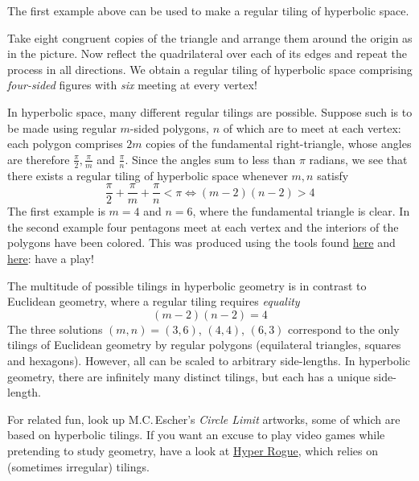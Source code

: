 \label{pg:hyptiling}

The first example above can be used to make a regular tiling of hyperbolic space.\par

\begin{minipage}[t]{0.55\linewidth}\vspace{0pt}
	Take eight congruent copies of the triangle and arrange them around the origin as in the picture. Now reflect the quadrilateral over each of its edges and repeat the process in all directions. We obtain a regular tiling of hyperbolic space comprising \emph{four-sided} figures with \emph{six} meeting at every vertex!\medbreak
	
	In hyperbolic space, many different regular tilings are possible. Suppose such is to be made using regular $m$-sided polygons, $n$ of which are to meet at each vertex: each polygon comprises $2m$ copies of the fundamental right-triangle, whose angles are therefore $\frac\pi 2, \frac\pi m$ and $\frac\pi n$.
	Since the angles sum to less than $\pi$ radians, we see that there exists a regular tiling of hyperbolic space whenever $m,n$ satisfy
	\[
		\frac\pi 2+\frac\pi m+\frac\pi n<\pi\iff (m-2)(n-2)>4
	\]
	The first example is $m=4$ and $n=6$, where the fundamental triangle is clear. In the second example four pentagons meet at each vertex and the interiors of the polygons have been colored. This was produced using the tools found
	\href{http://www.malinc.se/noneuclidean/en/poincaretiling.php}{here} and \href{http://www.malinc.se/m/ImageTiling.php}{here}: have a play!\medbreak
	
	The multitude of possible tilings in hyperbolic geometry is in contrast to Euclidean geometry, where a regular tiling requires \emph{equality}
	\[
		(m-2)(n-2)=4
	\]
	The three solutions $(m,n)=(3,6)$, $(4,4)$, $(6,3)$ correspond to the only tilings of Euclidean geometry by regular polygons (equilateral triangles, squares and hexagons). However, all can be scaled to arbitrary side-lengths. In hyperbolic geometry, there are infinitely many distinct tilings, but each has a unique side-length.\bigbreak
	
	For related fun, look up M.C.\,Escher's \emph{Circle Limit} artworks, some of which are based on hyperbolic tilings.
	If you want an excuse to play video games while pretending to study geometry, have a look at \href{http://www.roguetemple.com/z/hyper/}{Hyper Rogue}, which relies on (sometimes irregular) tilings.
\end{minipage}
